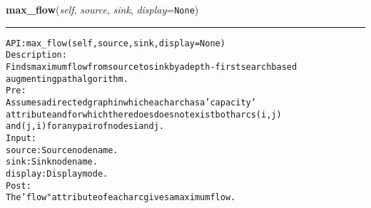     \label{coinor:gimpy:graph:Graph:max_flow}

    \vspace{0.5ex}

\hspace{.8\funcindent}\begin{boxedminipage}{\funcwidth}

    \raggedright \textbf{max\_flow}(\textit{self}, \textit{source}, \textit{sink}, \textit{display}={\tt None})

    \vspace{-1.5ex}

    \rule{\textwidth}{0.5\fboxrule}
\setlength{\parskip}{2ex}
\begin{alltt}

API: max\_flow(self, source, sink, display=None)
Description:
Finds maximum flow from source to sink by a depth-first search based
augmenting path algorithm.
Pre:
    Assumes a directed graph in which each arc has a 'capacity'
    attribute and for which there does does not exist both arcs (i,j)
    and (j, i) for any pair of nodes i and j.
Input:
    source: Source node name.
    sink: Sink node name.
    display: Display mode.
Post:
    The 'flow" attribute of each arc gives a maximum flow.
\end{alltt}

\setlength{\parskip}{1ex}
    \end{boxedminipage}

    \label{coinor:gimpy:graph:Graph:max_flow_preflowpush}

    \vspace{0.5ex}

